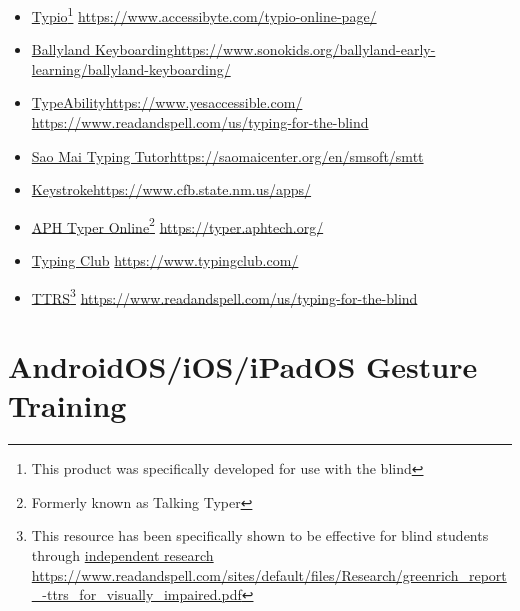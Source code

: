 \begin{itemize}[leftmargin=*]
\item \href{https://www.accessibyte.com/typio-online-page/}{Typio}\footnote{\raggedright This product was specifically developed for use with the blind} \break\url{https://www.accessibyte.com/typio-online-page/}
\item \href{https://www.sonokids.org/ballyland-early-learning/ballyland-keyboarding/}{Ballyland Keyboarding}\footnotemark[\value{footnote}]  \url{https://www.sonokids.org/ballyland-early-learning/ballyland-keyboarding/}
\item \href{https://www.yesaccessible.com/}{TypeAbility}\footnotemark[\value{footnote}] \break\url{https://www.yesaccessible.com/}
\break\url{https://www.readandspell.com/us/typing-for-the-blind}
\item \href{https://saomaicenter.org/en/smsoft/smtt}{Sao Mai Typing Tutor}\footnotemark[\value{footnote}] \break\url{https://saomaicenter.org/en/smsoft/smtt}
\item \href{https://www.cfb.state.nm.us/apps/}{Keystroke}\footnotemark[\value{footnote}] \break\url{https://www.cfb.state.nm.us/apps/}
\item \href{https://typer.aphtech.org/}{APH Typer Online}\footnotemark[\value{footnote}]\fnsep\footnote{\raggedright Formerly known as Talking Typer} \break\url{https://typer.aphtech.org/}
\item \href{https://www.typingclub.com/}{Typing Club} \break\url{https://www.typingclub.com/}
\item \href{https://www.readandspell.com/us/typing-for-the-blind}{TTRS}\footnote{\raggedright This resource has been specifically shown to be effective for blind students through \href{https://www.readandspell.com/sites/default/files/Research/greenrich_report_-ttrs_for_visually_imparied.pdf}{independent research} \break\url{https://www.readandspell.com/sites/default/files/Research/greenrich_report_-ttrs_for_visually_impaired.pdf}} \break\url{https://www.readandspell.com/us/typing-for-the-blind}
\end{itemize}

\pagebreak\hypertarget{appx6}{}\section[AndroidOS/iOS/iPadOS Gesture Training]{AndroidOS/iOS/iPadOS Gesture Training}\label{appx6}

